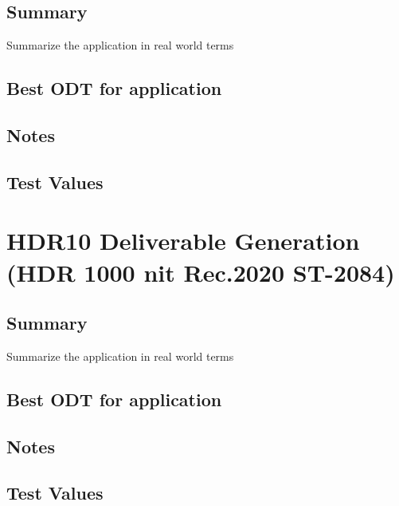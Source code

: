 \subsection{Summary}
\label{subsec:summary-rgbMonitor}

Summarize the application in real world terms

\subsection{Best ODT for application}
\label{subsec:bestODT-rgbMonitor}

\subsection{Notes}
\label{subsec:notes-rgbMonitor}

\subsection{Test Values}
\label{subsec:testValues-rgbMonitor}


\clearpage
\section{HDR10 Deliverable Generation (HDR 1000 nit Rec.2020 ST-2084)}
\label{sec:ot-app-hdr10}

\subsection{Summary}
\label{subsec:summary-hdr10}

Summarize the application in real world terms

\subsection{Best ODT for application}
\label{subsec:bestODT-hdr10}

\subsection{Notes}
\label{subsec:notes-hdr10}

\subsection{Test Values}
\label{subsec:testValues-hdr10}


